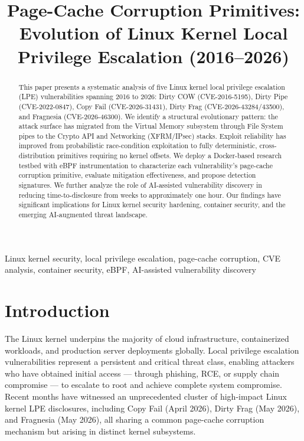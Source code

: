 \documentclass[conference]{IEEEtran}
\begin{document}
\title{Page-Cache Corruption Primitives: Evolution of Linux Kernel Local Privilege Escalation (2016--2026)}

\author{
}

\maketitle

\begin{abstract}
This paper presents a systematic analysis of five Linux kernel local privilege escalation (LPE) vulnerabilities spanning 2016 to 2026: Dirty COW (CVE-2016-5195), Dirty Pipe (CVE-2022-0847), Copy Fail (CVE-2026-31431), Dirty Frag (CVE-2026-43284/43500), and Fragnesia (CVE-2026-46300). We identify a structural evolutionary pattern: the attack surface has migrated from the Virtual Memory subsystem through File System pipes to the Crypto API and Networking (XFRM/IPsec) stacks. Exploit reliability has improved from probabilistic race-condition exploitation to fully deterministic, cross-distribution primitives requiring no kernel offsets. We deploy a Docker-based research testbed with eBPF instrumentation to characterize each vulnerability's page-cache corruption primitive, evaluate mitigation effectiveness, and propose detection signatures. We further analyze the role of AI-assisted vulnerability discovery in reducing time-to-disclosure from weeks to approximately one hour. Our findings have significant implications for Linux kernel security hardening, container security, and the emerging AI-augmented threat landscape.
\end{abstract}

\begin{IEEEkeywords}
Linux kernel security, local privilege escalation, page-cache corruption, CVE analysis, container security, eBPF, AI-assisted vulnerability discovery
\end{IEEEkeywords}

\section{Introduction}
The Linux kernel underpins the majority of cloud infrastructure, containerized workloads, and production server deployments globally. Local privilege escalation vulnerabilities represent a persistent and critical threat class, enabling attackers who have obtained initial access --- through phishing, RCE, or supply chain compromise --- to escalate to root and achieve complete system compromise. Recent months have witnessed an unprecedented cluster of high-impact Linux kernel LPE disclosures, including Copy Fail (April 2026), Dirty Frag (May 2026), and Fragnesia (May 2026), all sharing a common page-cache corruption mechanism but arising in distinct kernel subsystems.
\end{document}
